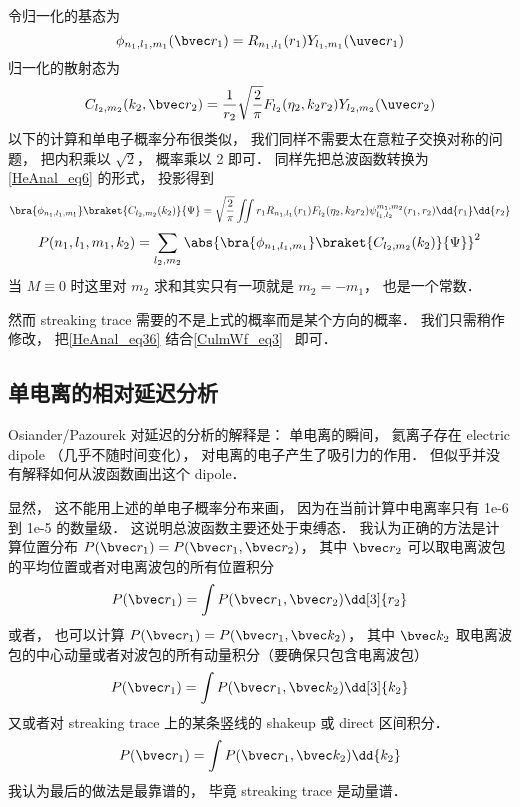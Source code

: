 令归一化的基态为
\begin{equation}
\phi_{n_1, l_1, m_1}(\bvec r_1) = R_{n_1,l_1}(r_1)Y_{l_1,m_1}(\uvec r_1)
\end{equation}
归一化的散射态为
\begin{equation}
C_{l_2, m_2}(k_2, \bvec r_2) = \frac{1}{r_2}\sqrt{\frac{2}{\pi}} F_{l_2}(\eta_2, k_2 r_2) Y_{l_2, m_2} (\uvec r_2)
\end{equation}
以下的计算和单电子概率分布很类似， 我们同样不需要太在意粒子交换对称的问题， 把内积乘以 $\sqrt{2}$， 概率乘以 2 即可． 同样先把总波函数转换为\autoref{HeAnal_eq6} 的形式， 投影得到
\begin{equation}\label{HeAnal_eq36}
\bra{\phi_{n_1, l_1, m_1}}\braket{C_{l_2, m_2}(k_2)}{\Psi} = \sqrt{\frac{2}{\pi}} \iint r_1 R_{n_1,l_1}(r_1) F_{l_2}(\eta_2, k_2 r_2) \psi_{l_1, l_2}^{m_1, m_2}(r_1, r_2) \dd{r_1} \dd{r_2}
\end{equation}
\begin{equation}
P(n_1, l_1, m_1, k_2) = \sum_{l_2, m_2}\abs{\bra{\phi_{n_1, l_1, m_1}}\braket{C_{l_2, m_2}(k_2)}{\Psi}}^2
\end{equation}
当 $M \equiv 0$ 时这里对 $m_2$ 求和其实只有一项就是 $m_2 = - m_1$， 也是一个常数．

然而 streaking trace 需要的不是上式的概率而是某个方向的概率． 我们只需稍作修改， 把\autoref{HeAnal_eq36} 结合\autoref{CulmWf_eq3}~ 即可．

\subsection{单电离的相对延迟分析}

Osiander/Pazourek 对延迟的分析的解释是： 单电离的瞬间， 氦离子存在 electric dipole （几乎不随时间变化）， 对电离的电子产生了吸引力的作用． 但似乎并没有解释如何从波函数画出这个 dipole．

显然， 这不能用上述的单电子概率分布来画， 因为在当前计算中电离率只有 1e-6 到 1e-5 的数量级． 这说明总波函数主要还处于束缚态． 我认为正确的方法是计算位置分布 $P(\bvec r_1) = P(\bvec r_1, \bvec r_2)$， 其中 $\bvec r_2$ 可以取电离波包的平均位置或者对电离波包的所有位置积分
\begin{equation}
P(\bvec r_1) = \int P(\bvec r_1, \bvec r_2) \dd[3]{r_2}
\end{equation}
或者， 也可以计算 $P(\bvec r_1) = P(\bvec r_1, \bvec k_2)$， 其中 $\bvec k_2$ 取电离波包的中心动量或者对波包的所有动量积分（要确保只包含电离波包）
\begin{equation}
P(\bvec r_1) = \int P(\bvec r_1, \bvec k_2) \dd[3]{k_2}
\end{equation}
又或者对 streaking trace 上的某条竖线的 shakeup 或 direct 区间积分．
\begin{equation}
P(\bvec r_1) = \int P(\bvec r_1, \bvec k_2) \dd{k_2}
\end{equation}
我认为最后的做法是最靠谱的， 毕竟 streaking trace 是动量谱．

